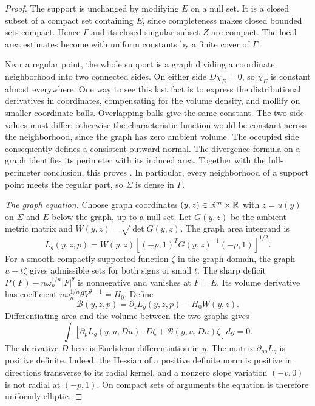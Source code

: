 \begin{proof}
The support is unchanged by modifying $E$ on a null set. It is a
closed subset of a compact set containing $E$, since completeness
makes closed bounded sets compact. Hence $\Gamma$ and its closed
singular subset $Z$ are compact. The local area estimates become
 with uniform constants by a finite
cover of $\Gamma$.

Near a regular point, the whole support is a graph dividing a
coordinate neighborhood into two connected sides. On either side
$D\chi_E=0$, so $\chi_E$ is constant almost everywhere. One way to
see this last fact is to express the distributional derivatives in
coordinates, compensating for the volume density, and mollify on
smaller coordinate balls. Overlapping balls give the same constant.
The two side values must differ: otherwise the characteristic
function would be constant across the neighborhood, since the graph
has zero ambient volume. The occupied side consequently defines a
consistent outward normal. The divergence formula on a graph
identifies its perimeter with its induced area. Together with the
full-perimeter conclusion, this proves
. In particular, every neighborhood
of a support point meets the regular part, so $\Sigma$ is dense in
$\Gamma$.

\emph{The graph equation.}
Choose graph coordinates $(y,z)\in\mathbb R^m\times\mathbb R$ with
$z=u(y)$ on $\Sigma$ and $E$ below the graph, up to a null set.
Let $G(y,z)$ be the ambient metric matrix and
$W(y,z)=\sqrt{\det G(y,z)}$. The graph area integrand is
\[
 L_g(y,z,p)
 =W(y,z)\left[(-p,1)^T G(y,z)^{-1}(-p,1)\right]^{1/2}.
\]
For a smooth compactly supported function $\zeta$ in the graph
domain, the graph $u+t\zeta$ gives admissible sets for both signs of
small $t$. The sharp deficit
$P(F)-n\omega_n^{1/n}|F|^\theta$ is nonnegative and vanishes at
$F=E$. Its volume derivative has coefficient
$n\omega_n^{1/n}\theta V^{\theta-1}=H_0$. Define
\[
 \mathcal B(y,z,p)=\partial_zL_g(y,z,p)-H_0W(y,z).
\]
Differentiating area and the volume between the two graphs gives
\begin{equation}
\label{eq:equality-graph-equation}
 \int\left[
  \partial_pL_g(y,u,Du)\cdot D\zeta
  +\mathcal B(y,u,Du)\zeta\right]dy=0.
\end{equation}
The derivative $D$ here is Euclidean differentiation in $y$.
The matrix $\partial_{pp}L_g$ is positive definite. Indeed, the
Hessian of a positive definite norm is positive in directions
transverse to its radial kernel, and a nonzero slope variation
$(-v,0)$ is not radial at $(-p,1)$. On compact sets of arguments the
equation is therefore uniformly elliptic.


\end{proof}

